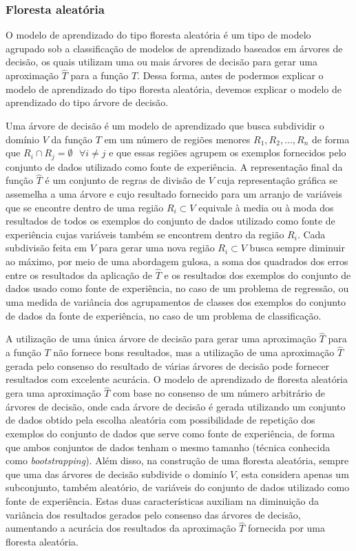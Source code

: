 \subsubsection{Floresta aleatória}

O modelo de aprendizado do tipo floresta aleatória é um tipo de modelo agrupado sob a classificação de modelos de aprendizado baseados em árvores de decisão, os quais utilizam uma ou mais árvores de decisão para gerar uma aproximação $\hat{T}$ para a função $T$. Dessa forma, antes de podermos explicar o modelo de aprendizado do tipo floresta aleatória, devemos explicar o modelo de aprendizado do tipo árvore de decisão.

Uma árvore de decisão é um modelo de aprendizado que busca subdividir o domínio $V$ da função $T$ em um número de regiões menores $R_{1}, R_{2}, ..., R_{n}$ de forma que $R_{i} \cap R_{j} = \emptyset \text{ } \forall i \ne j$ e que essas regiões agrupem os exemplos fornecidos pelo conjunto de dados utilizado como fonte de experiência. A representação final da função $\hat{T}$ é um conjunto de regras de divisão de $V$ cuja representação gráfica se assemelha a uma árvore e cujo resultado fornecido para um arranjo de variáveis que se encontre dentro de uma região $R_{i} \subset V$ equivale à media ou à moda dos resultados de todos os exemplos do conjunto de dados utilizado como fonte de experiência cujas variáveis também se encontrem dentro da região $R_{i}$.\cite[p.303]{statistical_learning} Cada subdivisão feita em $V$ para gerar uma nova região $R_{i} \subset V$ busca sempre diminuir ao máximo, por meio de uma abordagem gulosa, a soma dos quadrados dos erros entre os resultados da aplicação de $\hat{T}$ e os resultados dos exemplos do conjunto de dados usado como fonte de experiência, no caso de um problema de regressão, ou uma medida de variância dos agrupamentos de classes dos exemplos do conjunto de dados da fonte de experiência, no caso de um problema de classificação.\cite[p.306-307, 312]{statistical_learning}

A utilização de uma única árvore de decisão para gerar uma aproximação $\hat{T}$ para a função $T$ não fornece bons resultados, mas a utilização de uma aproximação $\hat{T}$ gerada pelo consenso do resultado de várias árvores de decisão pode fornecer resultados com excelente acurácia.\cite[p.303]{statistical_learning} O modelo de aprendizado de floresta aleatória gera uma aproximação $\hat{T}$ com base no consenso de um número arbitrário de árvores de decisão, onde cada árvore de decisão é gerada utilizando um conjunto de dados obtido pela escolha aleatória com possibilidade de repetição dos exemplos do conjunto de dados que serve como fonte de experiência, de forma que ambos conjuntos de dados tenham o mesmo tamanho (técnica conhecida como \textit{bootstrapping}). Além disso, na construção de uma floresta aleatória, sempre que uma das árvores de decisão subdivide o dominío $V$, esta considera apenas um subconjunto, também aleatório, de variáveis do conjunto de dados utilizado como fonte de experiência. Estas duas características auxiliam na diminuição da variância dos resultados gerados pelo consenso das árvores de decisão, aumentando a acurácia dos resultados da aproximação $\hat{T}$ fornecida por uma floresta aleatória.\cite[p.316-321]{statistical_learning}

